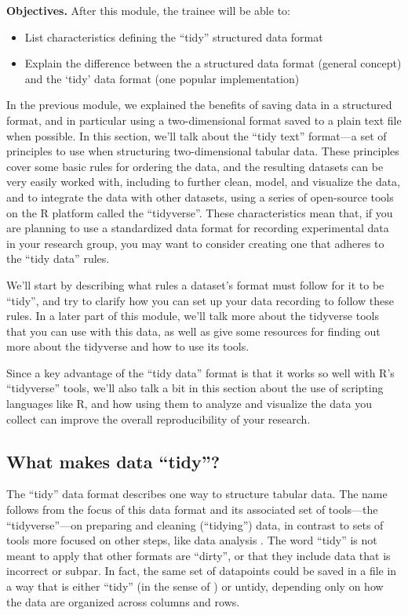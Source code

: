 \documentclass[]{tufte-book}
\providecommand{\tightlist}{%
  \setlength{\itemsep}{0pt}\setlength{\parskip}{0pt}}
\begin{document}
\textbf{Objectives.} After this module, the trainee will be able to:

\begin{itemize}
\tightlist
\item
  List characteristics defining the ``tidy'' structured data format
\item
  Explain the difference between the a structured data format (general concept)
  and the `tidy' data format (one popular implementation)
\end{itemize}

In the previous module, we explained the benefits of saving data in a structured
format, and in particular using a two-dimensional format saved to a plain text
file when possible. In this section, we'll talk about the ``tidy text'' format---a
set of principles to use when structuring two-dimensional tabular data. These
principles cover some basic rules for ordering the data, and the resulting
datasets can be very easily worked with, including to further clean, model, and
visualize the data, and to integrate the data with other datasets, using a
series of open-source tools on the R platform called the ``tidyverse''. These
characteristics mean that, if you are planning to use a standardized data format
for recording experimental data in your research group, you may want to consider
creating one that adheres to the ``tidy data'' rules.

We'll start by describing what rules a dataset's format must follow for it to be
``tidy'', and try to clarify how you can set up your data recording to follow
these rules. In a later part of this module, we'll talk more about the tidyverse
tools that you can use with this data, as well as give some resources for
finding out more about the tidyverse and how to use its tools.

Since a key advantage of the ``tidy data'' format is that it works so well with
R's ``tidyverse'' tools, we'll also talk a bit in this section about the use of
scripting languages like R, and how using them to analyze and visualize the
data you collect can improve the overall reproducibility of your research.

\hypertarget{what-makes-data-tidy}{%
\subsection{What makes data ``tidy''?}\label{what-makes-data-tidy}}

The ``tidy'' data format describes one way to structure tabular data. The name
follows from the focus of this data format and its associated set of tools---the
``tidyverse''---on preparing and cleaning (``tidying'') data, in contrast to sets of
tools more focused on other steps, like data analysis \citep{wickham2014tidy}. The
word ``tidy'' is not meant to apply that other formats are ``dirty'', or that they
include data that is incorrect or subpar. In fact, the same set of datapoints
could be saved in a file in a way that is either ``tidy'' (in the sense of
\citep{wickham2014tidy}) or untidy, depending only on how the data are organized
across columns and rows.
\end{document}
